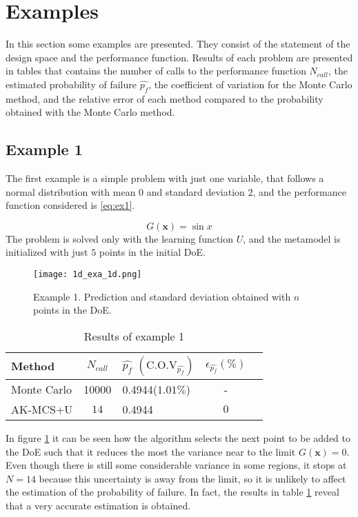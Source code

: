 \section{Examples}
In this section some examples are presented. They consist of the statement of the
design space and the performance function. Results of each problem are presented in
tables that contains the number of calls to the performance function $N_{call}$,
the estimated probability of failure $\widehat{p_f}$, the coefficient of variation
for the Monte Carlo method, and the relative error of each method compared to the
probability obtained with the Monte Carlo method.
\subsection{Example 1}
The first example is a simple problem with just one variable, that follows a normal distribution
with mean $0$ and standard deviation $2$, and the performance function considered is \ref{eq:ex1}.

\begin{equation}\label{eq:ex1}
    G(\pmb{x}) = \sin{x}
\end{equation}
The problem is solved only with the learning function $U$, and the metamodel is
initialized with just $5$ points in the initial DoE.


\begin{figure}[h!]
    \texttt{[image: 1d\_exa\_1d.png]}
    \caption{Example 1. Prediction and standard deviation obtained with $n$ points
    in the DoE.}
    \label{fig:ex1}
\end{figure}

\begin{table}[h]
  \footnotesize%
  \begin{center}
  \begin{tabular}{lclcc}
  \toprule
  Method & $N_{call}$  & $\widehat{p_f}$ $(\text{C.O.V}_{\widehat{p_f}})$ &$\epsilon_{\widehat{p_f}}(\%)$  \\
  \midrule
  Monte Carlo   & \num[round-precision=1,round-mode=figures]{10000} & \num{0.4944}($1.01\%$) & - \\
  AK-MCS+U & $14$ & \num{0.4944} & $0$ \\
  \bottomrule
  \end{tabular}
  \end{center}
  \caption{Results of example 1}
  \label{tab:res_ex1}
\end{table}

In figure \ref{fig:ex1} it can be seen how the algorithm selects the next point to
be added to the DoE such that it reduces the most the variance near to the limit 
$G(\pmb{x}) = 0$. Even though there is still some considerable variance in some regions,
it stops at $N = 14$ because this uncertainty is away from the limit, so it is
unlikely to affect the estimation of the probability of failure.
In fact, the results in table \ref{tab:res_ex1} reveal that a very accurate estimation
is obtained.

